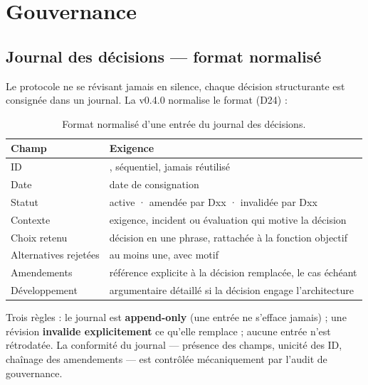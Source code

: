 \section{Gouvernance}\label{sec:gouvernance}

\subsection{Journal des décisions — format normalisé}\label{sec:journal}

Le protocole ne se révisant jamais en silence, chaque décision structurante est consignée
dans un journal. La v0.4.0 normalise le format (D24) :

\begin{table}[htbp]
\centering\small
\caption{Format normalisé d'une entrée du journal des décisions.}
\label{tab:formatdecisions}
\begin{tabularx}{\textwidth}{@{}l Y@{}}
\toprule
\textbf{Champ} & \textbf{Exigence} \\
\midrule
ID & , séquentiel, jamais réutilisé \\
Date & date de consignation \\
Statut & active · amendée par Dxx · invalidée par Dxx \\
Contexte & exigence, incident ou évaluation qui motive la décision \\
Choix retenu & décision en une phrase, rattachée à la fonction objectif \\
Alternatives rejetées & au moins une, avec motif \\
Amendements & référence explicite à la décision remplacée, le cas échéant \\
Développement & argumentaire détaillé si la décision engage l'architecture \\
\bottomrule
\end{tabularx}
\end{table}

Trois règles : le journal est \textbf{append-only} (une entrée ne s'efface jamais) ; une
révision \textbf{invalide explicitement} ce qu'elle remplace ; aucune entrée n'est
rétrodatée. La conformité du journal — présence des champs, unicité des ID, chaînage des
amendements — est contrôlée mécaniquement par l'audit de gouvernance.

